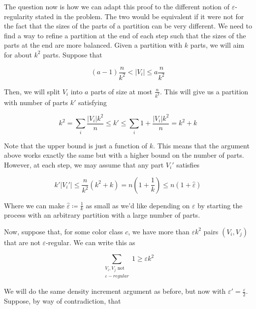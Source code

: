 \documentclass{amsart}
\theoremstyle{plain}
\theoremstyle{definition}
\begin{document}
    \newpage

    The question now is how we can adapt this proof to the different notion of
    $\varepsilon$-regularity stated in the problem.
    The two would be equivalent if it were not for the fact that the sizes of the parts of a partition can
    be very different.
    We need to find a way to refine a partition at the end of each step
    such that the sizes of the parts at the end
    are more balanced.
    Given a partition with $k$ parts, we will aim for about $k^2$ parts.
    Suppose that

    \[
        (a - 1) \frac{n}{k^2} < \lvert V_i \rvert \leq a \frac{n}{k^2}
    \]

    Then, we will split $V_i$ into $a$ parts of size at most $\frac{n}{k^2}$.
    This will give us a partition with number of parts $k'$ satisfying

    \[
        k^2 = \sum_{i} \frac{\lvert V_i \rvert k^2}{n} \leq k' \leq \sum_{i} 1 + \frac{\lvert V_i \rvert k^2}{n} = k^2 + k
    \]

    Note that the upper bound is just a function of $k$.
    This means that the argument above works exactly the same but with a higher
    bound on the number of parts.
    However, at each step, we may assume that any part $V_i'$ satisfies

    \begin{equation} \label{eq:bound}
        k' \lvert V_i' \rvert \leq \frac{n}{k^2}(k^2 + k) = n\left(1 + \frac{1}{k}\right) \leq  n\left(1 + \hat{\varepsilon} \right)
    \end{equation}

    Where we can make $\hat{\varepsilon} \coloneqq \frac{1}{k}$ as small as we'd like depending on $\varepsilon$
    by starting the process with an arbitrary partition with a large number of parts.

    Now, suppose that, for some color class $c$, we have more than
    $\varepsilon k^2$ pairs $(V_i, V_j)$ that are not $\varepsilon$-regular.
    We can write this as

    \begin{equation} \label{eq:many_pairs}
        \sum_{\substack{V_i, V_j \text{ not } \\ \varepsilon-regular}} 1 \geq \varepsilon k^2
    \end{equation}

    We will do the same density increment argument as before, but now with $\varepsilon' = \frac{\varepsilon}{2}$.
    Suppose, by way of contradiction, that
\end{document}
